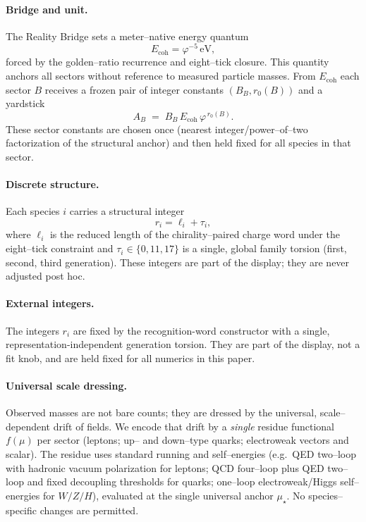 \documentclass[epjc3]{svjour3}
\begin{document}
\paragraph{Bridge and unit.}
The Reality Bridge sets a meter–native energy quantum
\[
E_{\mathrm{coh}}=\varphi^{-5}\,\mathrm{eV},
\]
forced by the golden–ratio recurrence and eight–tick closure. This quantity anchors all sectors without reference to measured particle masses. From $E_{\mathrm{coh}}$ each sector $B$ receives a frozen pair of integer constants $(B_B,r_0(B))$ and a yardstick
\[
A_B \;=\; B_B\,E_{\mathrm{coh}}\,\varphi^{\,r_0(B)}.
\]
These sector constants are chosen once (nearest integer/power–of–two factorization of the structural anchor) and then held fixed for all species in that sector.

\paragraph{Discrete structure.}
Each species $i$ carries a structural integer
\[
r_i=\ell_i+\tau_i,
\]
where $\ell_i$ is the reduced length of the chirality–paired charge word under the eight–tick constraint and $\tau_i\in\{0,11,17\}$ is a single, global family torsion (first, second, third generation). These integers are part of the display; they are never adjusted post hoc.

\paragraph{External integers.}
The integers $r_i$ are fixed by the recognition-word constructor with a single, representation-independent generation torsion. They are part of the display, not a fit knob, and are held fixed for all numerics in this paper.

\paragraph{Universal scale dressing.}
Observed masses are not bare counts; they are dressed by the universal, scale–dependent drift of fields. We encode that drift by a \emph{single} residue functional $f(\mu)$ per sector (leptons; up– and down–type quarks; electroweak vectors and scalar). The residue uses standard running and self–energies (e.g.\ QED two–loop with hadronic vacuum polarization for leptons; QCD four–loop plus QED two–loop and fixed decoupling thresholds for quarks; one–loop electroweak/Higgs self–energies for $W/Z/H$), evaluated at the single universal anchor $\mu_\star$. No species–specific changes are permitted.
\end{document}
